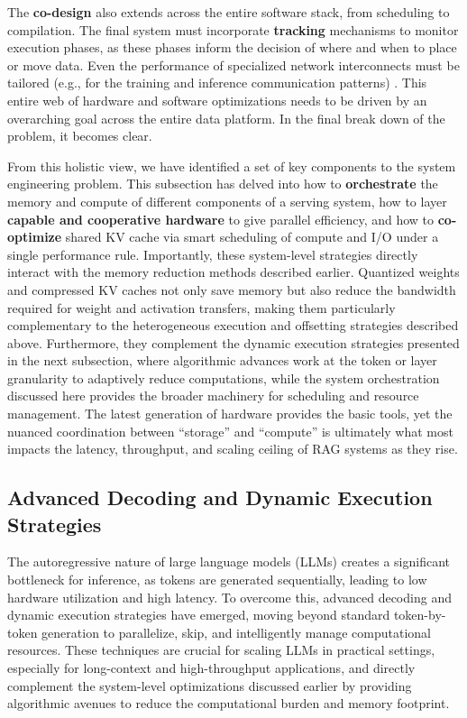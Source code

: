\documentclass[11pt]{article}
\begin{document}
The \textbf{co-design} also extends across the entire software stack, from scheduling to compilation. The final system must incorporate \textbf{tracking} mechanisms to monitor execution phases, as these phases inform the decision of where and when to place or move data. Even the performance of specialized network interconnects must be tailored (e.g., for the training and inference communication patterns) \cite{ref322}. This entire web of hardware and software optimizations needs to be driven by an overarching goal across the entire data platform. In the final break down of the problem, it becomes clear.

From this holistic view, we have identified a set of key components to the system engineering problem. This subsection has delved into how to \textbf{orchestrate} the memory and compute of different components of a serving system, how to layer \textbf{capable and cooperative hardware} to give parallel efficiency, and how to \textbf{co-optimize} shared KV cache via smart scheduling of compute and I/O under a single performance rule. Importantly, these system-level strategies directly interact with the memory reduction methods described earlier. Quantized weights and compressed KV caches not only save memory but also reduce the bandwidth required for weight and activation transfers, making them particularly complementary to the heterogeneous execution and offsetting strategies described above. Furthermore, they complement the dynamic execution strategies presented in the next subsection, where algorithmic advances work at the token or layer granularity to adaptively reduce computations, while the system orchestration discussed here provides the broader machinery for scheduling and resource management. The latest generation of hardware provides the basic tools, yet the nuanced coordination between ``storage'' and ``compute'' is ultimately what most impacts the latency, throughput, and scaling ceiling of RAG systems as they rise.

\subsection{Advanced Decoding and Dynamic Execution Strategies}

The autoregressive nature of large language models (LLMs) creates a significant bottleneck for inference, as tokens are generated sequentially, leading to low hardware utilization and high latency. To overcome this, advanced decoding and dynamic execution strategies have emerged, moving beyond standard token-by-token generation to parallelize, skip, and intelligently manage computational resources. These techniques are crucial for scaling LLMs in practical settings, especially for long-context and high-throughput applications, and directly complement the system-level optimizations discussed earlier by providing algorithmic avenues to reduce the computational burden and memory footprint.
\end{document}
